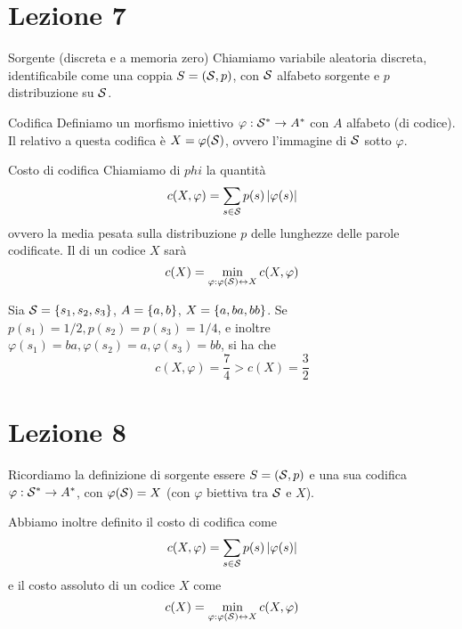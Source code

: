 \chapter{Lezione 7}\label{ch:test}


\begin{definition}{Sorgente (discreta e a memoria zero)}
  Chiamiamo   variabile aleatoria discreta, identificabile come una coppia \(S = (\mathcal{S},p)\), con \(\mathcal{S}\) alfabeto sorgente e \(p\) distribuzione su \(\mathcal{S}\).
\end{definition}
\begin{definition}{Codifica}
  Definiamo  un morfismo iniettivo \(\varphi: \mathcal{S}^* \to A^*\) con \(A\) alfabeto (di codice).
  Il  relativo a questa codifica è \(X = \varphi(\mathcal{S})\), ovvero l'immagine di \(\mathcal{S}\) sotto \(\varphi\).
\end{definition}
\begin{definition}{Costo di codifica}
  Chiamiamo  di \(phi\) la quantità
  \[c(X,\varphi) = \sum_{s \in \mathcal{S}} p(s) \left|\varphi(s)\right|\]
  ovvero la media pesata sulla distribuzione \(p\) delle lunghezze delle parole codificate.
  Il  di un codice \(X\) sarà
  \[c(X) = \min_{\varphi: \varphi(\mathcal{S}) \leftrightarrow  X} c(X,\varphi)\]
\end{definition}

\begin{example}[label=ex:codifica]{}
  Sia \(\SCal = \set{s_1,s_2,s_3}\), \(A = \set{a,b}\), \(X = \set{a,ba,bb}\).
  Se \(p(s_1) = 1/2, p(s_2) = p(s_3) = 1/4\), e inoltre \(\varphi(s_1) = ba, \varphi(s_2) = a, \varphi(s_3) = bb\), si ha che
    \[c(X,\varphi) = \frac{7}{4} > c(X) = \frac{3}{2}\]
\end{example}

\chapter{Lezione 8}

Ricordiamo la definizione di sorgente essere \(S = (\mathcal{S}, p)\) e una sua codifica \(\varphi: \mathcal{S}^* \to A^*\),  con \(\varphi(\mathcal{S}) = X\) (con \(\varphi\) biettiva tra \(\mathcal{S}\) e \(X\)).

Abbiamo inoltre definito il costo di codifica come
\[c(X,\varphi) = \sum_{s \in \mathcal{S}} p(s) \left|\varphi(s)\right|\]
e il costo assoluto di un codice \(X\) come
\[c(X) = \min_{\varphi: \varphi(\mathcal{S}) \leftrightarrow X} c(X,\varphi)\]

